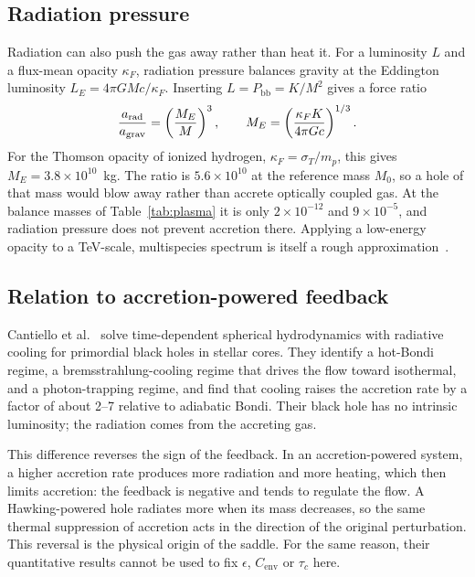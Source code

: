 \documentclass[11pt,a4paper]{article}
\newcommand{\Pbb}{P_{\mathrm{bb}}}
\newcommand{\Cenv}{C_{\mathrm{env}}}
\begin{document}
\subsection{Radiation pressure}
Radiation can also push the gas away rather than heat it. For a luminosity $L$ and a flux-mean opacity $\kappa_F$, radiation pressure balances gravity at the Eddington luminosity $L_E=4\pi GMc/\kappa_F$. Inserting $L=\Pbb=K/M^2$ gives a force ratio
\begin{equation*}
 \frac{a_{\rm rad}}{a_{\rm grav}}=\left(\frac{M_E}{M}\right)^3,\qquad
 M_E=\left(\frac{\kappa_FK}{4\pi Gc}\right)^{1/3}.
\end{equation*}
For the Thomson opacity of ionized hydrogen, $\kappa_F=\sigma_T/m_p$, this gives $M_E=3.8\times10^{10}$~kg. The ratio is $5.6\times10^{10}$ at the reference mass $M_0$, so a hole of that mass would blow away rather than accrete optically coupled gas. At the balance masses of Table~\ref{tab:plasma} it is only $2\times10^{-12}$ and $9\times10^{-5}$, and radiation pressure does not prevent accretion there. Applying a low-energy opacity to a TeV-scale, multispecies spectrum is itself a rough approximation~\cite{ciotti}.

\subsection{Relation to accretion-powered feedback}
Cantiello et al.~\cite{cantiello} solve time-dependent spherical hydrodynamics with radiative cooling for primordial black holes in stellar cores. They identify a hot-Bondi regime, a bremsstrahlung-cooling regime that drives the flow toward isothermal, and a photon-trapping regime, and find that cooling raises the accretion rate by a factor of about 2--7 relative to adiabatic Bondi. Their black hole has no intrinsic luminosity; the radiation comes from the accreting gas.

This difference reverses the sign of the feedback. In an accretion-powered system, a higher accretion rate produces more radiation and more heating, which then limits accretion: the feedback is negative and tends to regulate the flow. A Hawking-powered hole radiates more when its mass decreases, so the same thermal suppression of accretion acts in the direction of the original perturbation. This reversal is the physical origin of the saddle. For the same reason, their quantitative results cannot be used to fix $\epsilon$, $\Cenv$ or $\tau_c$ here.
\end{document}
